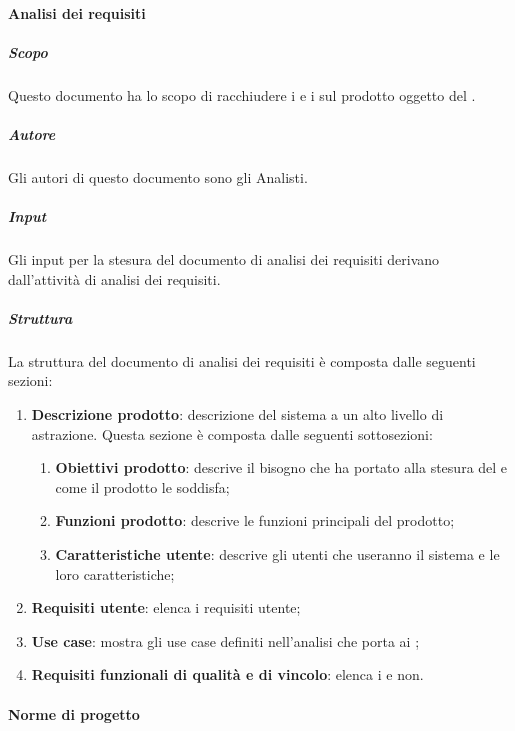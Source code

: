 \paragraph{Analisi dei requisiti}

\subparagraph{Scopo}
Questo documento ha lo scopo di racchiudere i  e i  sul prodotto oggetto del .

\subparagraph{Autore}
Gli autori di questo documento sono gli Analisti.

\subparagraph{Input}    
Gli input per la stesura del documento di analisi dei requisiti derivano dall'attività di analisi dei requisiti.

\subparagraph{Struttura}
La struttura del documento di analisi dei requisiti è composta dalle seguenti sezioni:
\begin{enumerate}
    \item \textbf{Descrizione prodotto}: descrizione del sistema a un alto livello di astrazione.
    Questa sezione è composta dalle seguenti sottosezioni:
    \begin{enumerate}
        \item \textbf{Obiettivi prodotto}: descrive il bisogno che ha portato alla stesura del  e come il prodotto le soddisfa;
        
        \item \textbf{Funzioni prodotto}: descrive le funzioni principali del prodotto;

        \item \textbf{Caratteristiche utente}: descrive gli utenti che useranno il sistema e le loro caratteristiche;
    \end{enumerate}
    \item \textbf{Requisiti utente}: elenca i requisiti utente;

    \item \textbf{Use case}: mostra gli use case definiti nell'analisi che porta ai ;
    
    \item \textbf{Requisiti funzionali di qualità e di vincolo}: elenca i  e non.
\end{enumerate}

\paragraph{Norme di progetto}

